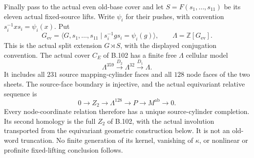 Finally pass to the actual even old-base cover and let
$S=F(s_1,\ldots,s_{11})$ be its eleven actual fixed-source lifts.
Write $\psi_i$ for their pushes, with convention
$s_i^{-1}x s_i=\psi_i(x)$. Put
\[
 G_{\mathrm{ev}}=\langle G,s_1,\ldots,s_{11}\mid
                    s_i^{-1}g s_i=\psi_i(g)\rangle,
 \qquad \Lambda=\mathbb Z[G_{\mathrm{ev}}].
\]
This is the actual split extension $G\rtimes S$, with the displayed
conjugation convention. The actual cover $C_E$ of B.102 has a finite
free $\Lambda$ cellular model
\begin{equation}\label{eq:B104-finite-complex}
       \Lambda^{359}\xrightarrow{D_2}
       \Lambda^{32}\xrightarrow{D_1}\Lambda.
\end{equation}
It includes all $231$ source mapping-cylinder faces and all $128$
node faces of the two sheets. The source-face boundary is injective,
and the actual equivariant relative sequence is
\[
 0\longrightarrow Z_2\longrightarrow\Lambda^{128}
       \longrightarrow P\longrightarrow M^{\mathrm{ab}}
       \longrightarrow0.
\]
Every node-coordinate relation therefore has a unique source-cylinder
completion. Its second homology is the full
$Z_2$ of B.102, with the actual involution transported from the
equivariant geometric construction below. It is not an old-word
truncation. No finite generation of its kernel, vanishing of
$\kappa$, or nonlinear or profinite fixed-lifting conclusion follows.

